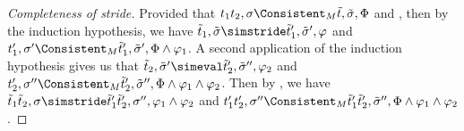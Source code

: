 \begin{proof}[Completeness of stride]
  {
  Provided that $t_1\And t_2,\sigma\Consistent_M \tilde{t},\tilde{\sigma},\Phi$ and ,
  then by the induction hypothesis, we have $\tilde{t}_1,\tilde{\sigma}\simstride\tilde{t}_1',\tilde{\sigma}',\phi$
  and $t_1',\sigma'\Consistent_M\tilde{t}_1',\tilde{\sigma}',\Phi\land\phi_1$.
  A second application of the induction hypothesis gives us that $\tilde{t}_2,\tilde{\sigma}'\simeval \tilde{t}_2',\tilde{\sigma}'',\phi_2$
  and $t_2',\sigma''\Consistent_M\tilde{t}_2',\tilde{\sigma}'',\Phi\land\phi_1\land\phi_2$.
  Then by , we have $\tilde{t}_1\And\tilde{t}_2,\sigma\simstride\tilde{t}_1'\And\tilde{t}_2',\sigma'',\phi_1\land\phi_2$
  and $t_1'\And t_2',\sigma''\Consistent_M\tilde{t}_1'\And \tilde{t}_2',\tilde{\sigma}'',\Phi\land\phi_1\land\phi_2$.

  }
\end{proof}

